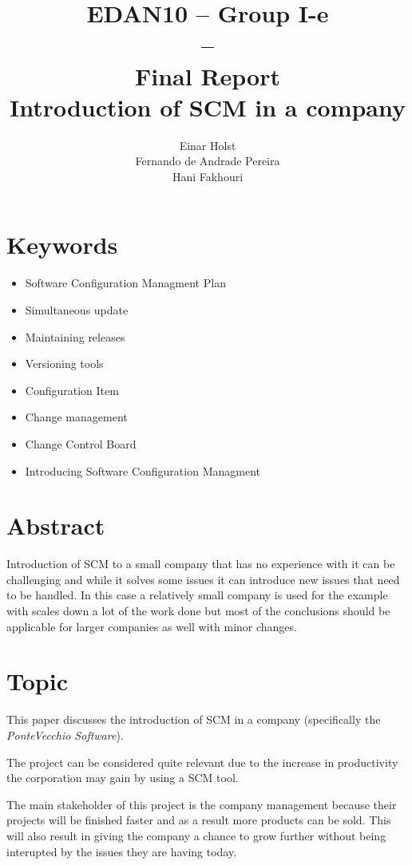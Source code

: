 \documentclass[a4paper]{article}
\title{EDAN10 -- Group I-e\\--\\ Final Report \\
Introduction of SCM in a company 
}
\author{Einar Holst \\
Fernando de Andrade Pereira \\
Hani Fakhouri
}
\begin{document}
\maketitle
\thispagestyle{empty}
\clearpage

\tableofcontents
\thispagestyle{empty}
\clearpage

\setcounter{page}{1}

\section{Keywords}
\begin{itemize}
\item Software Configuration Managment Plan
\item Simultaneous update
\item Maintaining releases
\item Versioning tools
\item Configuration Item
\item Change management
\item Change Control Board
\item Introducing Software Configuration Managment
\end{itemize}

\section{Abstract}
Introduction of SCM to a small company that has no experience with it can be challenging and while it solves some issues it can introduce new issues that need to be handled. In this case a relatively small company is used for the example with scales down a lot of the work done but most of the conclusions should be applicable for larger companies as well with minor changes.

\section{Topic}
This paper discusses the introduction of SCM in a company (specifically the \emph{PonteVecchio Software}).

The project can be considered quite relevant due to the increase in productivity the corporation may gain by using a SCM tool.

The main stakeholder of this project is the company management because their projects will be finished faster and as a result more products can be sold. This will also result in giving the company a chance to grow further without being interupted by the issues they are having today.
\end{document}
